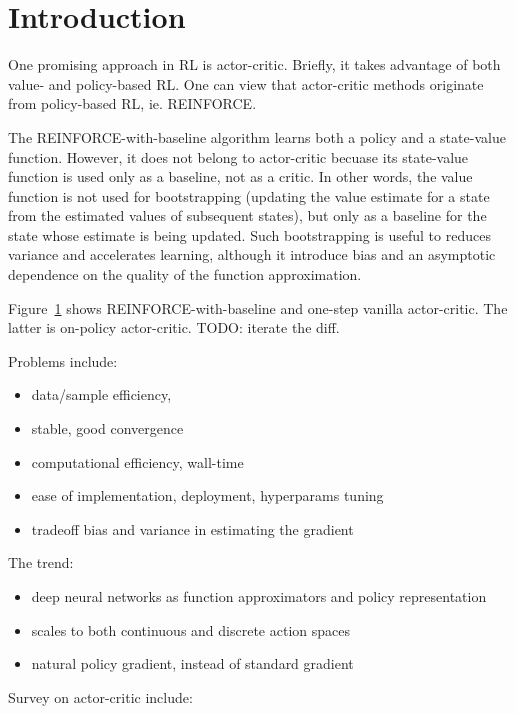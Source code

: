 \section{Introduction}

One promising approach in RL is actor-critic.
Briefly, it takes advantage of both value- and policy-based RL.
One can view that actor-critic methods originate from policy-based RL, ie. REINFORCE.

The REINFORCE-with-baseline algorithm learns both a policy and a state-value function.
However, it does not belong to actor-critic becuase
its state-value function is used only as a baseline, not as a critic.
In other words, the value function is not used for bootstrapping
(updating the value estimate for a state from the estimated values of subsequent states),
but only as a baseline for the state whose estimate is being updated.
Such bootstrapping is useful to reduces variance and accelerates learning,
although it introduce bias and an asymptotic dependence on
the quality of the function approximation.

Figure~\ref{} shows REINFORCE-with-baseline and one-step vanilla actor-critic.
The latter is on-policy actor-critic.
TODO: iterate the diff.

Problems include:
\begin{itemize}
\item data/sample efficiency,
\item stable, good convergence
\item computational efficiency, wall-time
\item ease of implementation, deployment, hyperparams tuning
\item tradeoff bias and variance in estimating the gradient
\end{itemize}

The trend:
\begin{itemize}
\item deep neural networks as
      function approximators and policy representation
\item scales to both continuous and discrete action spaces
\item natural policy gradient, instead of standard gradient
\end{itemize}

Survey on actor-critic include:
\cite{6392457}




